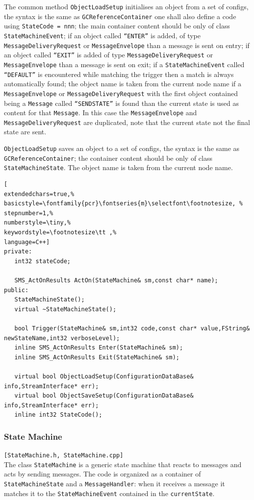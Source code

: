 The common method \texttt{ObjectLoadSetup} initialises an object from a set of configs, the syntax is the same as \texttt{GCReferenceContainer} one shall also define a code using \texttt{StateCode = nnn}; the main container content should be only of class \texttt{StateMachineEvent}; if an object called \texttt{``ENTER''} is added, of type \texttt{MessageDeliveryRequest} or \texttt{MessageEnvelope} than a message is sent on entry; if an object called \texttt{``EXIT''} is added of type \texttt{MessageDeliveryRequest} or \texttt{MessageEnvelope} than a message is sent on exit; if a \texttt{StateMachineEvent} called \texttt{``DEFAULT''} is encountered while matching the trigger then a match is always automatically found; the object name is taken from the current node name if a \texttt{MessageEnvelope} or \texttt{MessageDeliveryRequest} with the first object contained being a \texttt{Message} called \texttt{``SENDSTATE''} is found than the current state is used as content for that \texttt{Message}. In this case the \texttt{MessageEnvelope} and \texttt{MessageDeliveryRequest} are duplicated, note that the current state not the final state are sent.

\texttt{ObjectLoadSetup} saves an object to a set of configs, the syntax is the same as \texttt{GCReferenceContainer}; the container content should be only of class \texttt{StateMachineState}. The object name is taken from the current node name.

\begin{lstlisting}[
extendedchars=true,%
basicstyle=\fontfamily{pcr}\fontseries{m}\selectfont\footnotesize, %
stepnumber=1,%
numberstyle=\tiny,%
keywordstyle=\footnotesize\tt ,%
language=C++]
private:
   int32 stateCode;

   SMS_ActOnResults ActOn(StateMachine& sm,const char* name);
public:
   StateMachineState();
   virtual ~StateMachineState();

   bool Trigger(StateMachine& sm,int32 code,const char* value,FString& newStateName,int32 verboseLevel);
   inline SMS_ActOnResults Enter(StateMachine& sm);
   inline SMS_ActOnResults Exit(StateMachine& sm);

   virtual bool ObjectLoadSetup(ConfigurationDataBase& info,StreamInterface* err);
   virtual bool ObjectSaveSetup(ConfigurationDataBase& info,StreamInterface* err);
   inline int32 StateCode();
\end{lstlisting}



\subsubsection{State Machine}
\texttt{[StateMachine.h, StateMachine.cpp]}\\
The class \texttt{StateMachine} is a generic state machine that reacts to messages and acts by sending messages. The code is organized as a container of \texttt{StateMachineState} and a \texttt{MessageHandler}: when it receives a message it matches it to the \texttt{StateMachineEvent} contained in the \texttt{currentState}.


